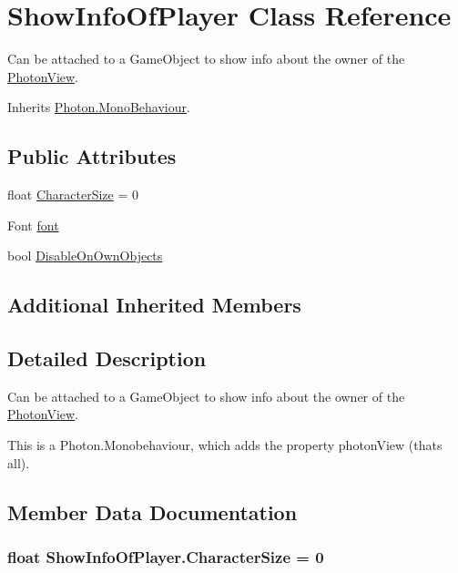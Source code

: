 \hypertarget{class_show_info_of_player}{}\section{Show\+Info\+Of\+Player Class Reference}
\label{class_show_info_of_player}


Can be attached to a Game\+Object to show info about the owner of the \hyperlink{class_photon_view}{Photon\+View}.  




Inherits \hyperlink{class_photon_1_1_mono_behaviour}{Photon.\+Mono\+Behaviour}.

\subsection*{Public Attributes}
\begin{DoxyCompactItemize}
\item 
float \hyperlink{class_show_info_of_player_a3ca691afacbede3ba6003e9fe9382122}{Character\+Size} = 0
\item 
Font \hyperlink{class_show_info_of_player_ad21009b17d92004b3172cc7e63eac70e}{font}
\item 
bool \hyperlink{class_show_info_of_player_a4f3344f49a450e169bce73cb3c1acd42}{Disable\+On\+Own\+Objects}
\end{DoxyCompactItemize}
\subsection*{Additional Inherited Members}


\subsection{Detailed Description}
Can be attached to a Game\+Object to show info about the owner of the \hyperlink{class_photon_view}{Photon\+View}. 

This is a Photon.\+Monobehaviour, which adds the property photon\+View (that\textquotesingle{}s all). 

\subsection{Member Data Documentation}
\subsubsection[{\texorpdfstring{Character\+Size}{CharacterSize}}]{\setlength{\rightskip}{0pt plus 5cm}float Show\+Info\+Of\+Player.\+Character\+Size = 0}\hypertarget{class_show_info_of_player_a3ca691afacbede3ba6003e9fe9382122}{}\label{class_show_info_of_player_a3ca691afacbede3ba6003e9fe9382122}
